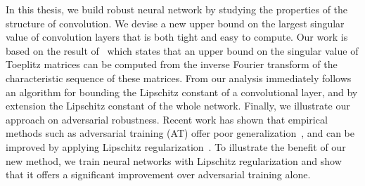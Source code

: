 In this thesis, we build robust neural network by studying the properties of the structure of convolution.
We devise a new upper bound on the largest singular value of convolution layers that is both tight and easy to compute. 
Our work is based on the result of~\citet{gray2006toeplitz} which states that an upper bound on the singular value of Toeplitz matrices can be computed from the inverse Fourier transform of the characteristic sequence of these matrices.
From our analysis immediately follows an algorithm for bounding the Lipschitz constant of a convolutional layer, and by extension the Lipschitz constant of the whole network.
Finally, we illustrate our approach on adversarial robustness. 
Recent work has shown that empirical methods such as adversarial training (AT) offer poor generalization~\cite{schmidt2018adversarially}, and can be improved by applying Lipschitz regularization~\cite{farnia2018generalizable}.
To illustrate the benefit of our new method, we train neural networks with Lipschitz regularization and show that it offers a significant improvement over adversarial training alone.





